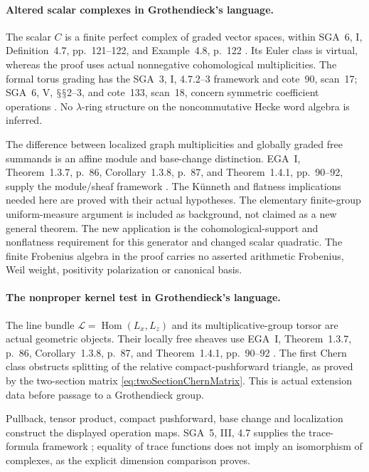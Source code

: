 \documentclass[11pt,a4paper]{article}
\renewcommand{\S}{\ensuremath{\mathsection}}
\theoremstyle{named}\newtheorem{finding}{Finding}[section]
\theoremstyle{definition}\newtheorem{definition}[finding]{Definition}
\theoremstyle{remark}\newtheorem{remark}[finding]{Remark}
\begin{document}
\paragraph{Altered scalar complexes in Grothendieck's language.}
The scalar \(C\) is a finite perfect complex of graded
vector spaces, within SGA~6, I, Definition~4.7,
pp.~121--122, and Example~4.8, p.~122 \cite{SGA6}.
Its Euler class is virtual, whereas the proof uses
actual nonnegative cohomological multiplicities.
The formal torus grading has the SGA~3, I, 4.7.2--3
framework and cote~90, scan~17; SGA~6, V, \S\S2--3,
and cote~133, scan~18, concern symmetric coefficient
operations \cite{SGA3,SGA6,Archive}.
No \(\lambda\)-ring structure on the noncommutative
Hecke word algebra is inferred.

The difference between localized graph multiplicities
and globally graded free summands is an affine module
and base-change distinction. EGA~I, Theorem~1.3.7,
p.~86, Corollary~1.3.8, p.~87, and Theorem~1.4.1,
pp.~90--92, supply the module/sheaf framework \cite{EGA}.
The K\"unneth and flatness implications needed here are
proved with their actual hypotheses. The elementary
finite-group uniform-measure argument is included as
background, not claimed as a new general theorem.
The new application is the cohomological-support and
nonflatness requirement for this generator and changed
scalar quadratic. The finite Frobenius algebra in
the proof carries no asserted arithmetic Frobenius,
Weil weight, positivity polarization or canonical basis.

\paragraph{The nonproper kernel test in Grothendieck's language.}
The line bundle
\(\mathcal L=\operatorname{Hom}(L_x,L_z)\) and its
multiplicative-group torsor are actual geometric objects.
Their locally free sheaves use EGA~I, Theorem~1.3.7, p.~86,
Corollary~1.3.8, p.~87, and Theorem~1.4.1, pp.~90--92
\cite{EGA}. The first Chern class obstructs splitting of
the relative compact-pushforward triangle, as proved by
the two-section matrix \eqref{eq:twoSectionChernMatrix}.
This is actual extension data before passage to a
Grothendieck group.

Pullback, tensor product, compact pushforward, base change
and localization construct the displayed operation maps.
SGA~5, III, 4.7 supplies the trace-formula framework
\cite{SGA5}; equality of trace functions does not imply
an isomorphism of complexes, as the explicit dimension
comparison proves.
\end{document}
